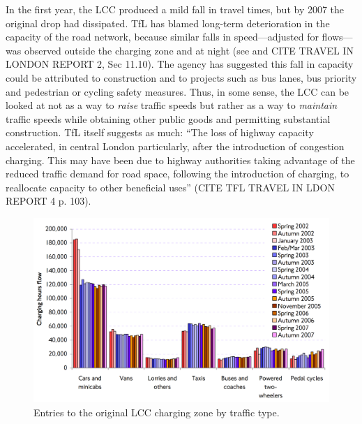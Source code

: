 In the first year, the LCC produced a mild fall in travel times, but by 2007 the original  drop had dissipated. TfL has blamed long-term deterioration in the capacity of the road network, because similar falls in speed---adjusted for flows---was observed outside the charging zone and at night (see \citet[p. 45-55]{TfLFifth2007} and CITE TRAVEL IN LONDON REPORT 2, Sec 11.10). The agency has suggested this fall in capacity could be attributed to construction and to projects such as bus lanes, bus priority and pedestrian or cycling safety measures. Thus, in some sense, the LCC can be looked at not as a way to \emph{raise} traffic speeds but rather as a way to \emph{maintain} traffic speeds while obtaining other public goods and permitting substantial construction.  TfL itself suggests as much: ``The loss of highway capacity accelerated, in central London particularly,
after the introduction of congestion charging. This may have been due to highway authorities taking advantage of the reduced traffic demand for road space, following the introduction of charging, to reallocate capacity to other beneficial uses'' (CITE TFL TRAVEL IN LDON REPORT 4 p. 103).

\begin{figure}[ht]
    \includegraphics[width=.95\textwidth]{../img/london-entries.png}
    \caption{Entries to the original LCC charging zone by traffic type. \citep[p. 20]{TfLFifth2007} } \label{fig:london-entries}
\end{figure}




